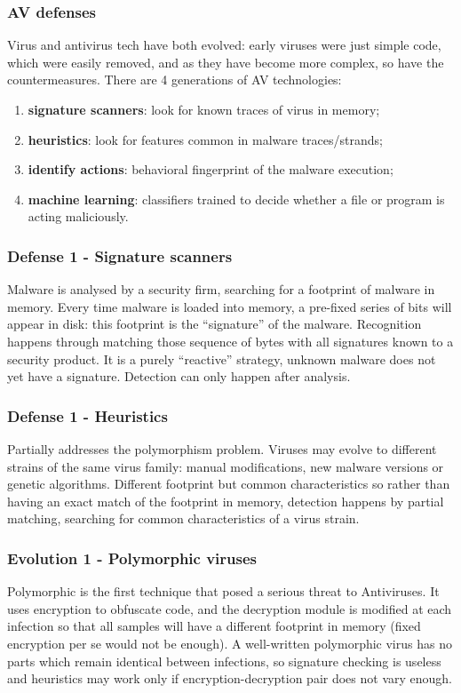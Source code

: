 \documentclass[a4paper, 10pt, titlepage]{article}
\begin{document}
\subsubsection*{AV defenses}
Virus and antivirus tech have both evolved: early viruses were just simple code, which were easily removed, and as they have become more complex, so have the countermeasures. There are 4 generations of AV technologies:
\begin{enumerate}
	\item \textbf{signature scanners}: look for known traces of virus in memory;
	\item \textbf{heuristics}: look for features common in malware 	traces/strands;
	\item \textbf{identify actions}: behavioral fingerprint of the malware execution;
	\item \textbf{machine learning}: classifiers trained to decide whether a file or program is acting maliciously.
\end{enumerate}

\subsubsection*{Defense 1 - Signature scanners}
Malware is analysed by a security firm, searching for a footprint of malware in memory. Every time malware is loaded into memory, a pre-fixed series of bits will appear in disk: this footprint is the “signature” of the malware. Recognition happens through matching those sequence of bytes with all signatures known to a security product. It is a purely “reactive” strategy, unknown malware does not yet have a signature. Detection can only happen after analysis.

\subsubsection*{Defense 1 - Heuristics}
Partially addresses the polymorphism problem. Viruses may evolve to different strains of the same virus family: manual modifications, new malware versions or genetic algorithms.
Different footprint but common characteristics so rather than having an exact match of the footprint in memory, detection happens by partial matching, searching for common characteristics of a virus strain.

\subsubsection*{Evolution 1 - Polymorphic viruses}
Polymorphic is the first technique that posed a serious threat to Antiviruses. It uses encryption to obfuscate code, and the decryption module is modified at each infection so that all samples will have a different footprint in memory (fixed encryption per se would not be enough). 
A well-written polymorphic virus has no parts which remain identical between infections, so signature checking is useless and heuristics may work only if encryption-decryption pair does not vary enough.
\end{document}
